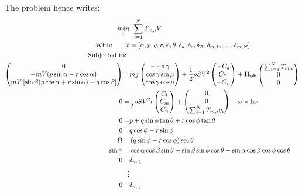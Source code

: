 The problem hence writes:
\begin{align}
\underset{\tilde{x}}{min} & \: \:\sum_{i=1}^{N} T_{m,i} V\\
\text{With:}\qquad \tilde{x}&=[\alpha, p, q, r, \phi, \theta, \delta_a, \delta_e, \delta_R, \delta_{m,1}, \dots, \delta_{m,N}]\\
\text{Subjected to: }&\notag \\
\begin{pmatrix}
0 \\
-mV(p\sin\alpha - r\cos\alpha)\\
mV\left[\sin\beta (p\cos\alpha + r\sin\alpha) - q\cos\beta\right]
\end{pmatrix}
= & mg
\begin{pmatrix}
-\sin\gamma\\
\cos\gamma \sin\mu\\
\cos\gamma \cos\mu	
\end{pmatrix}
+ \frac{1}{2} \rho S V^2
\begin{pmatrix}
-C_d\\
C_Y\\
-C_L
\end{pmatrix}
+ \mathbf{H_{ab}} 
\begin{pmatrix}
\sum_{i=1}^{N} T_{m,i}\\
0\\
0
\end{pmatrix} \\
0 =& \frac{1}{2} \rho S V^2 l
\begin{pmatrix}
C_l\\
C_m\\
C_n
\end{pmatrix}
+
\begin{pmatrix}
0\\
0\\
\sum_{i=1}^{N} T_{m,i} y_i
\end{pmatrix} -\omega \times \textbf{I}\omega\\
0= & p + q\sin\phi \tan\theta + r \cos\phi \tan\theta\\
0= & q\cos\phi -r\sin \phi\\
\Omega = & \left( q \sin \phi + r \cos \phi \right) \sec \theta \\
\sin \gamma = & \cos\alpha\cos\beta\sin\theta - \sin\beta\sin\phi\cos\theta - \sin\alpha\cos\beta\cos\phi\cos\theta\\
0 = & \delta_{m,1}\\
\vdots\notag\\
0 = & \delta_{m,j}
\end{align}

